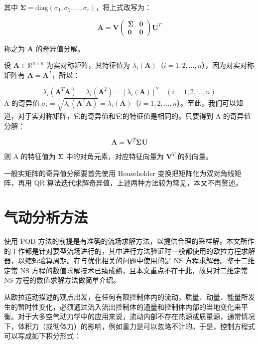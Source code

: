 其中 \(\mathbf{\Sigma} = \text{diag}(\sigma_1, \sigma_2, \ldots, \sigma_r)\)，将上式改写为：

\begin{equation}
\mathbf{A} = \mathbf{V} \begin{pmatrix} \mathbf{\Sigma} & \mathbf{0} \\ \mathbf{0} & \mathbf{0} \end{pmatrix} \mathbf{U}^T \tag{2-21}
\end{equation}

称之为 \(\mathbf{A}\) 的奇异值分解。

设 \(\mathbf{A} \in \mathbb{R}^{n \times n}\) 为实对称矩阵，其特征值为 \(\lambda_i(\mathbf{A})\)（\(i = 1, 2, \ldots, n\)），因为对实对称矩阵有 \(\mathbf{A} = \mathbf{A}^T\)，所以：

\begin{equation}
\lambda_i(\mathbf{A}^T \mathbf{A}) = \lambda_i(\mathbf{A}^2) = \left[ \lambda_i(\mathbf{A}) \right]^2 \quad (i = 1, 2, \ldots, n) \tag{2-22}
\end{equation}
A 的奇异值 \(\sigma_i = \sqrt{\lambda_i(\mathbf{A}^T \mathbf{A})} = \lambda_i(\mathbf{A})\)（\(i = 1, 2, \ldots, n\)）。至此，我们可以知道，对于实对称矩阵，它的奇异值和它的特征值是相同的。只要得到 A 的奇异值分解：

\begin{equation}
\mathbf{A} = \mathbf{V}^T \mathbf{\Sigma} \mathbf{U} \tag{2-23}
\end{equation}

则 A 的特征值为 \(\mathbf{\Sigma}\) 中的对角元素，对应特征向量为 \(\mathbf{V}^T\) 的列向量。

一般实矩阵的奇异值分解要首先使用 Householder 变换把矩阵化为双对角线矩阵，再用 QR 算法迭代求解奇异值，上述两种方法较为常见，本文不再赘述。
\section{气动分析方法}
使用 POD 方法的前提是有准确的流场求解方法，以提供合理的采样解。本文所作的工作都是针对要型流场进行的，其中进行方法验证时一般都使用的欧拉方程求解器，以缩短验算周期。在与优化相关的问题中使用的是 NS 方程求解器。鉴于二维定常 NS 方程的数值求解技术已臻成熟，且本文重点不在于此，故只对二维定常 NS 方程的数值求解方法做简单介绍。

从欧拉运动描述的观点出发，在任何有限控制体内的流动，质量、动量、能量所发生的暂时性变化，必须通过流入流出控制体的通量和控制体内部的当地变化来平衡。对于大多空气动力学中的应用来说，流动内部不存在热源或质量源，通常情况下，体积力（或彻体力）的影响，例如重力是可以忽略不计的。于是，控制方程式可以写成如下积分形式：

